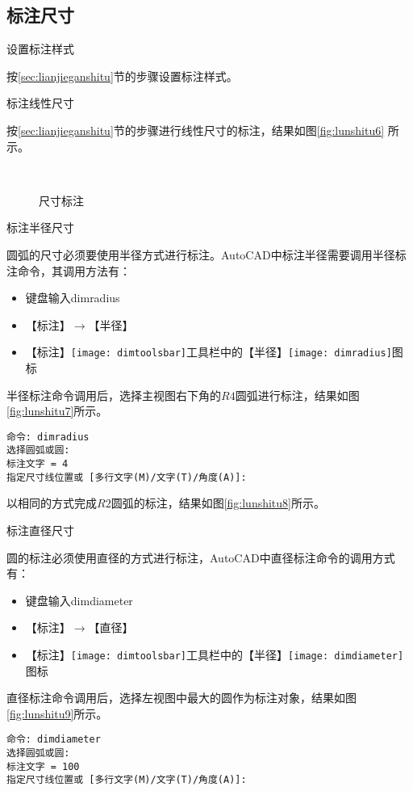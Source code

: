 \subsection{标注尺寸}
\begin{procedure}
\item 设置标注样式

按\ref{sec:lianjieganshitu}节的步骤设置标注样式。

\item 标注线性尺寸

按\ref{sec:lianjieganshitu}节的步骤进行线性尺寸的标注，结果如图\ref{fig:lunshitu6} 所示。

\begin{figure}[htbp]
\centering
{}\hspace{20pt}
\\
\hspace{20pt}
\caption{尺寸标注}
\end{figure}
\item 标注半径尺寸

圆弧的尺寸必须要使用半径方式进行标注。AutoCAD中标注半径需要调用半径标注命令，其调用方法有：
\begin{itemize}
\item 键盘输入dimradius
\item 【标注】$\rightarrow $【半径】
\item 【标注】\texttt{[image: dimtoolsbar]}工具栏中的【半径】\texttt{[image: dimradius]}图标
\end{itemize}

半径标注命令调用后，选择主视图右下角的$R4$圆弧进行标注，结果如图\ref{fig:lunshitu7}所示。
\begin{lstlisting}
命令: dimradius
选择圆弧或圆:
标注文字 = 4
指定尺寸线位置或 [多行文字(M)/文字(T)/角度(A)]:
\end{lstlisting}

以相同的方式完成$R2$圆弧的标注，结果如图\ref{fig:lunshitu8}所示。
\item 标注直径尺寸

圆的标注必须使用直径的方式进行标注，AutoCAD中直径标注命令的调用方式有：
\begin{itemize}
\item 键盘输入dimdiameter
\item 【标注】$\rightarrow $【直径】
\item 【标注】\texttt{[image: dimtoolsbar]}工具栏中的【半径】\texttt{[image: dimdiameter]}图标
\end{itemize}

直径标注命令调用后，选择左视图中最大的圆作为标注对象，结果如图\ref{fig:lunshitu9}所示。

\begin{lstlisting}
命令: dimdiameter
选择圆弧或圆:
标注文字 = 100
指定尺寸线位置或 [多行文字(M)/文字(T)/角度(A)]:
\end{lstlisting}
\end{procedure}
\endinput